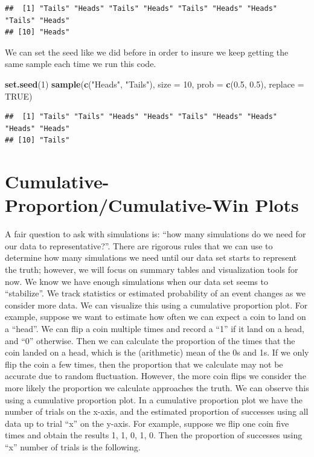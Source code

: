 \documentclass[
]{book}
\newenvironment{Shaded}{\begin{snugshade}}{\end{snugshade}}
\newcommand{\DataTypeTok}[1]{\textcolor[rgb]{0.13,0.29,0.53}{#1}}
\newcommand{\DecValTok}[1]{\textcolor[rgb]{0.00,0.00,0.81}{#1}}
\newcommand{\FloatTok}[1]{\textcolor[rgb]{0.00,0.00,0.81}{#1}}
\newcommand{\KeywordTok}[1]{\textcolor[rgb]{0.13,0.29,0.53}{\textbf{#1}}}
\newcommand{\NormalTok}[1]{#1}
\newcommand{\OtherTok}[1]{\textcolor[rgb]{0.56,0.35,0.01}{#1}}
\newcommand{\StringTok}[1]{\textcolor[rgb]{0.31,0.60,0.02}{#1}}
\begin{document}
\begin{verbatim}
##  [1] "Tails" "Heads" "Tails" "Heads" "Tails" "Heads" "Heads" "Tails" "Heads"
## [10] "Heads"
\end{verbatim}

We can set the seed like we did before in order to insure we keep getting the same sample each time we run this code.

\begin{Shaded}
\begin{Highlighting}[]
\KeywordTok{set.seed}\NormalTok{(}\DecValTok{1}\NormalTok{)}
\KeywordTok{sample}\NormalTok{(}\KeywordTok{c}\NormalTok{(}\StringTok{"Heads"}\NormalTok{, }\StringTok{"Tails"}\NormalTok{), }\DataTypeTok{size =} \DecValTok{10}\NormalTok{, }\DataTypeTok{prob =} \KeywordTok{c}\NormalTok{(}\FloatTok{0.5}\NormalTok{, }\FloatTok{0.5}\NormalTok{), }\DataTypeTok{replace =} \OtherTok{TRUE}\NormalTok{)}
\end{Highlighting}
\end{Shaded}

\begin{verbatim}
##  [1] "Tails" "Tails" "Heads" "Heads" "Tails" "Heads" "Heads" "Heads" "Heads"
## [10] "Tails"
\end{verbatim}

\hypertarget{cumulative-proportioncumulative-win-plots}{%
\section{Cumulative-Proportion/Cumulative-Win Plots}\label{cumulative-proportioncumulative-win-plots}}

A fair question to ask with simulations is: ``how many simulations do we need for our data to representative?''. There are rigorous rules that we can use to determine how many simulations we need until our data set starts to represent the truth; however, we will focus on summary tables and visualization tools for now. We know we have enough simulations when our data set seems to ``stabilize''. We track statistics or estimated probability of an event changes as we consider more data. We can visualize this using a cumulative proportion plot. For example, suppose we want to estimate how often we can expect a coin to land on a ``head''. We can flip a coin multiple times and record a ``1'' if it land on a head, and ``0'' otherwise. Then we can calculate the proportion of the times that the coin landed on a head, which is the (arithmetic) mean of the 0s and 1s. If we only flip the coin a few times, then the proportion that we calculate may not be accurate due to random fluctuation. However, the more coin flips we consider the more likely the proportion we calculate approaches the truth. We can observe this using a cumulative proportion plot. In a cumulative proportion plot we have the number of trials on the x-axis, and the estimated proportion of successes using all data up to trial ``x'' on the y-axis. For example, suppose we flip one coin five times and obtain the results 1, 1, 0, 1, 0. Then the proportion of successes using ``x'' number of trials is the following.
\end{document}
